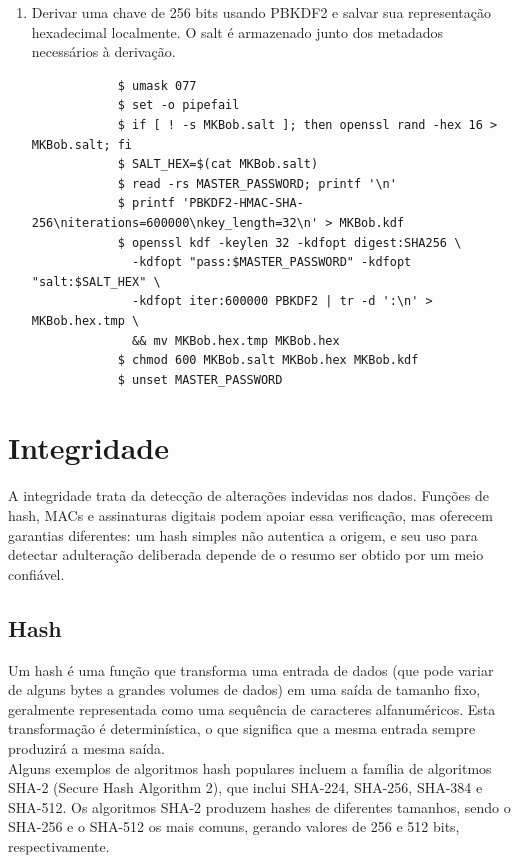 \documentclass{article}
\begin{document}
\begin{enumerate}
	\item Derivar uma chave de 256 bits usando PBKDF2 e salvar sua representação hexadecimal localmente. O salt é armazenado junto dos metadados necessários à derivação.
	\begin{tcolorbox}[width=\textwidth]
	{\footnotesize
		\begin{verbatim}
			$ umask 077
			$ set -o pipefail
			$ if [ ! -s MKBob.salt ]; then openssl rand -hex 16 > MKBob.salt; fi
			$ SALT_HEX=$(cat MKBob.salt)
			$ read -rs MASTER_PASSWORD; printf '\n'
			$ printf 'PBKDF2-HMAC-SHA-256\niterations=600000\nkey_length=32\n' > MKBob.kdf
			$ openssl kdf -keylen 32 -kdfopt digest:SHA256 \
			  -kdfopt "pass:$MASTER_PASSWORD" -kdfopt "salt:$SALT_HEX" \
			  -kdfopt iter:600000 PBKDF2 | tr -d ':\n' > MKBob.hex.tmp \
			  && mv MKBob.hex.tmp MKBob.hex
			$ chmod 600 MKBob.salt MKBob.hex MKBob.kdf
			$ unset MASTER_PASSWORD
		\end{verbatim}
	}
	\end{tcolorbox}
\end{enumerate}

\pagebreak

\section{Integridade}

A integridade trata da detecção de alterações indevidas nos dados. Funções de hash, MACs e assinaturas digitais podem apoiar essa verificação, mas oferecem garantias diferentes: um hash simples não autentica a origem, e seu uso para detectar adulteração deliberada depende de o resumo ser obtido por um meio confiável.
\subsection{Hash}

Um hash é uma função que transforma uma entrada de dados (que pode variar de alguns bytes a grandes volumes de dados) em uma saída de tamanho fixo, geralmente representada como uma sequência de caracteres alfanuméricos. Esta transformação é determinística, o que significa que a mesma entrada sempre produzirá a mesma saída.\\

Alguns exemplos de algoritmos hash populares incluem a família de algoritmos SHA-2 (Secure Hash Algorithm 2), que inclui SHA-224, SHA-256, SHA-384 e SHA-512. Os algoritmos SHA-2 produzem hashes de diferentes tamanhos, sendo o SHA-256 e o SHA-512 os mais comuns, gerando valores de 256 e 512 bits, respectivamente.\\
\end{document}
